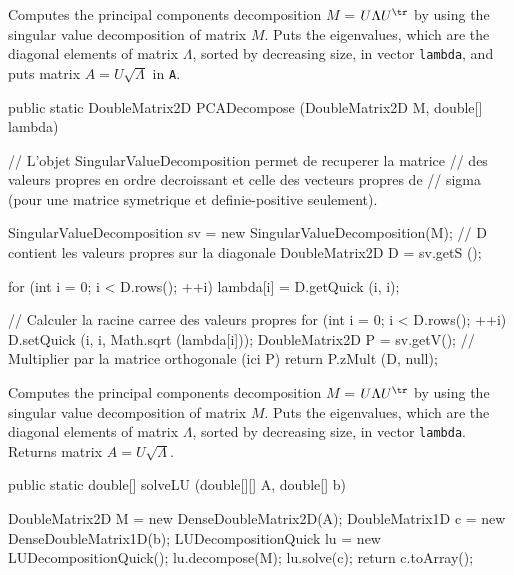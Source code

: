 \begin{tabb} Computes the principal components decomposition $M$ =
 $U\Lambda U^{\tr}$ by using the singular value decomposition of matrix
$M$. Puts the eigenvalues, which are the diagonal elements of matrix $\Lambda$,
sorted by decreasing size, in vector \texttt{lambda}, and puts matrix
 $A = U\sqrt{\Lambda}$ in \texttt{A}.
\end{tabb}
\begin{htmlonly}
\end{htmlonly}
\begin{code}

   public static DoubleMatrix2D PCADecompose (DoubleMatrix2D M,
                                              double[] lambda)\begin{hide} {
      // L'objet SingularValueDecomposition permet de recuperer la matrice
      // des valeurs propres en ordre decroissant et celle des vecteurs propres de
      // sigma (pour une matrice symetrique et definie-positive seulement).

      SingularValueDecomposition sv = new SingularValueDecomposition(M);
      // D contient les valeurs propres sur la diagonale
      DoubleMatrix2D D = sv.getS ();

      for (int i = 0; i < D.rows(); ++i)
         lambda[i] = D.getQuick (i, i);

      // Calculer la racine carree des valeurs propres
      for (int i = 0; i < D.rows(); ++i)
         D.setQuick (i, i, Math.sqrt (lambda[i]));
      DoubleMatrix2D P = sv.getV();
      // Multiplier par la matrice orthogonale (ici P)
      return P.zMult (D, null);
   }\end{hide}
\end{code}
\begin{tabb} Computes the principal components decomposition $M$ =
 $U\Lambda U^{\tr}$ by using the singular value decomposition of matrix
$M$. Puts the eigenvalues, which are the diagonal elements of matrix $\Lambda$,
sorted by decreasing size, in vector \texttt{lambda}. Returns matrix
 $A = U\sqrt{\Lambda}$.
\end{tabb}
\begin{htmlonly}
\end{htmlonly}
\begin{code}

   public static double[] solveLU (double[][] A, double[] b) \begin{hide} {
      DoubleMatrix2D M = new DenseDoubleMatrix2D(A);
      DoubleMatrix1D c = new DenseDoubleMatrix1D(b);
      LUDecompositionQuick lu = new LUDecompositionQuick();
      lu.decompose(M);
      lu.solve(c);
      return c.toArray();
   } \end{hide}
\end{code}
